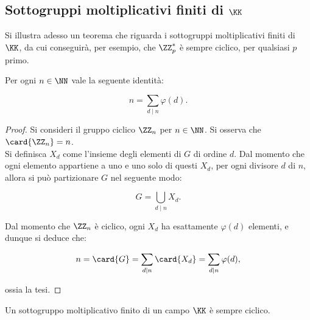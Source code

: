 \subsection{Sottogruppi moltiplicativi finiti di $\KK$}

Si illustra adesso un teorema che riguarda i sottogruppi
moltiplicativi finiti di $\KK$, da cui conseguirà,
per esempio, che $\ZZ_p^*$ è sempre ciclico, per
qualsiasi $p$ primo. \\

\begin{lemma}
    \label{lem:somma_phi_n}
    Per ogni $n \in \NN$ vale la seguente identità:

    \[ n = \sum_{d \mid n} \varphi(d). \]
\end{lemma}

\begin{proof}
    Si consideri il gruppo ciclico $\ZZ_n$ per $n \in \NN$.
    Si osserva che $\card{\ZZ_n} = n$. \\

    Si definisca $X_d$ come l'insieme degli elementi di $G$
    di ordine $d$. Dal momento che ogni elemento appartiene
    a uno e uno solo di questi $X_d$, per ogni divisore
    $d$ di $n$, allora si può partizionare $G$ nel
    seguente modo:

    \begin{equation*}
        G = \bigcup_{d \mid n} X_d.
    \end{equation*}

    Dal momento che $\ZZ_n$ è ciclico, ogni $X_d$ ha esattamente
    $\varphi(d)$ elementi, e dunque si deduce che:

    \begin{equation*}
        n = \card{G} = \sum_{d \mid n} \card{X_d} =  \sum_{d \mid n} \varphi(d),
    \end{equation*}

    ossia la tesi.
\end{proof}

\begin{theorem}
    Un sottogruppo moltiplicativo finito di un campo
    $\KK$ è sempre ciclico.
\end{theorem}

